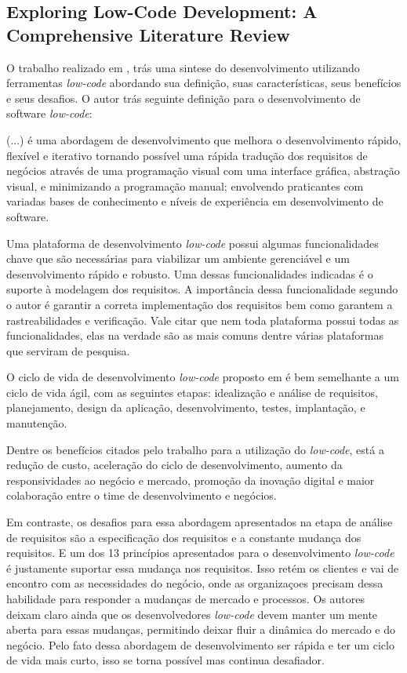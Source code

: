 {		\subsection{Exploring Low-Code Development: A Comprehensive Literature Review}

		O trabalho realizado em \cite{LowCodeExploring}, trás uma sintese do desenvolvimento utilizando
		ferramentas \textit{low-code} abordando sua definição, suas características, seus benefícios e seus desafios.
		O autor trás seguinte definição para o desenvolvimento de software \textit{low-code}:

		\begin{quoting}
		\noindent (...) é uma abordagem de desenvolvimento que melhora o desenvolvimento rápido, flexível e iterativo tornando possível
		uma rápida tradução dos requisitos de negócios através de uma programação visual com uma interface gráfica, abstração visual, 
		e minimizando a programação manual; envolvendo praticantes com variadas bases de conhecimento e níveis de experiência em 
		desenvolvimento de software.
		\end{quoting}

		Uma plataforma de desenvolvimento \textit{low-code} possui algumas funcionalidades chave que são necessárias para viabilizar um 
		ambiente gerenciável e um desenvolvimento rápido e robusto. Uma dessas funcionalidades indicadas é o suporte à modelagem dos requisitos. A importância dessa funcionalidade segundo 
		o autor é garantir a correta implementação dos requisitos bem como garantem a rastreabilidades e verificação. Vale citar que nem toda plataforma possui todas as funcionalidades, elas na 
		verdade são as mais comuns dentre várias plataformas que serviram de pesquisa.

		O ciclo de vida de desenvolvimento \textit{low-code} proposto em \cite{LowCodeExploring} é bem semelhante a um ciclo de vida ágil, com as seguintes etapas: idealização e análise 
		de requisitos, planejamento, design da aplicação, desenvolvimento, testes, implantação, e manutenção.

		Dentre os benefícios citados pelo trabalho para a utilização do \textit{low-code}, está a redução de custo, aceleração do ciclo de desenvolvimento, aumento da responsividades 
		ao negócio e mercado, promoção da inovação digital e maior colaboração entre o time de desenvolvimento e negócios.

		Em contraste, os desafios para essa abordagem apresentados na etapa de análise de requisitos são a especificação dos requisitos e a constante mudança dos requisitos. E um dos 13 princípios 
		apresentados para o desenvolvimento \textit{low-code} é justamente suportar essa mudança nos requisitos. Isso retém os clientes e vai de encontro com as necessidades do negócio, 
		onde as organizaçoes precisam dessa habilidade para responder a mudanças de mercado e processos. Os autores deixam claro ainda que os desenvolvedores \textit{low-code} devem manter um mente aberta
		para essas mudanças, permitindo deixar fluir a dinâmica do mercado e do negócio. Pelo fato dessa abordagem de desenvolvimento ser rápida e ter um ciclo de vida mais curto, isso se torna possível 
		mas continua desafiador. 
	}